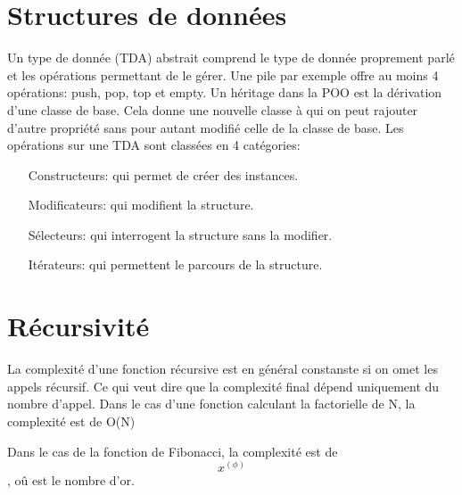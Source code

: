 \documentclass{article}
\begin{document}
\section{Structures de données}
Un type de donnée (TDA) abstrait comprend le type de donnée proprement parlé et les opérations permettant de le gérer.
Une pile par exemple offre au moins 4 opérations: push, pop, top et empty. 
Un héritage dans la POO est la dérivation d'une classe de base. Cela donne une nouvelle classe à qui on peut rajouter d'autre propriété sans pour autant modifié celle de la classe de base. 
Les opérations sur une TDA sont classées en 4 catégories:
\begin{itemize}
	\item[Constructeurs:] qui permet de créer des instances.
	\item[Modificateurs:] qui modifient la structure.
	\item[Sélecteurs:] qui interrogent la structure sans la modifier.
	\item[Itérateurs:] qui permettent le parcours de la structure. 
\end{itemize}

\section{Récursivité}
La complexité d'une fonction récursive est en général constanste si on omet les appels récursif. Ce qui veut dire que la complexité final dépend uniquement du nombre d'appel. Dans le cas d'une fonction calculant la factorielle de N, la complexité est de O(N)

Dans le cas de la fonction de Fibonacci, la complexité est de $$ x^(\phi) $$, oû \phi est le nombre d'or. 
\end{document}
